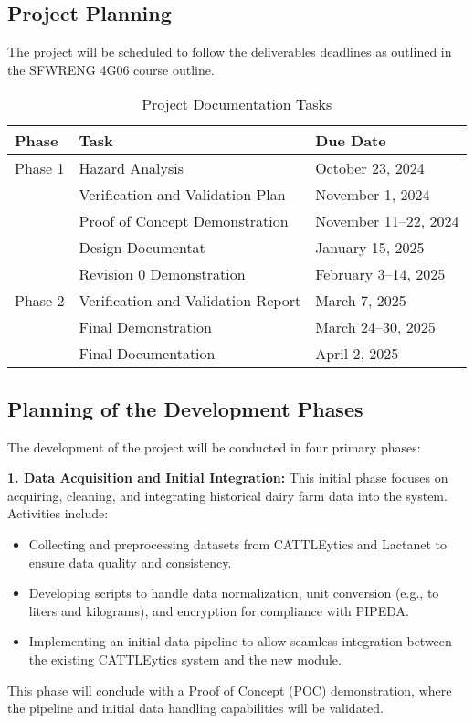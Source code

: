 \documentclass[12pt]{article}
\begin{document}
\subsection{Project Planning}

The project will be scheduled to follow the deliverables deadlines as outlined
in the SFWRENG 4G06 course outline.

\begin{table}[h]
	\centering
	\caption{Project Documentation Tasks}
	\vspace{5pt}
	\begin{tabular}{|p{}|p{}|p{}|}
		\hline
		\textbf{Phase} & \textbf{Task}                      & \textbf{Due Date}
		\\
		\hline
		Phase 1        & Hazard Analysis                    & October 23, 2024
		\\
		\cline{2-3}    & Verification and Validation Plan   & November 1, 2024
		\\
		\cline{2-3}    & Proof of Concept Demonstration     & November 11--22, 2024
		\\
		\cline{2-3}    & Design Documentat                  & January 15, 2025
		\\
		\cline{2-3}    & Revision 0 Demonstration           & February 3--14, 2025
		\\
		\hline
		Phase 2        & Verification and Validation Report & March 7, 2025
		\\
		\cline{2-3}    & Final Demonstration                & March 24--30, 2025
		\\
		\cline{2-3}    & Final Documentation                & April 2, 2025
		\\
		\hline
	\end{tabular}

	\label{project_tasks}
\end{table}

\subsection{Planning of the Development Phases}
The development of the project will be conducted in four primary phases:

\textbf{1. Data Acquisition and Initial Integration:} This initial phase focuses
on acquiring, cleaning, and integrating historical dairy farm data into the
system. Activities include:
\begin{itemize}
    \item Collecting and preprocessing datasets from CATTLEytics and Lactanet to
    ensure data quality and consistency.
    \item Developing scripts to handle data normalization, unit conversion
    (e.g., to liters and kilograms), and encryption for compliance with PIPEDA.
    \item Implementing an initial data pipeline to allow seamless integration
    between the existing CATTLEytics system and the new module.
\end{itemize}
This phase will conclude with a Proof of Concept (POC) demonstration, where the
pipeline and initial data handling capabilities will be validated.
\end{document}
